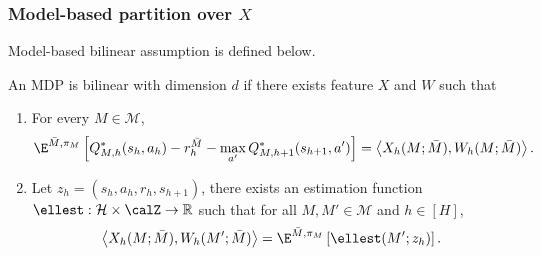 \subsubsection{Model-based partition over $X$}
Model-based bilinear assumption is defined below.
\begin{definition}
An MDP is bilinear with dimension $d$ if there exists feature $X$ and $W$ such that
\begin{enumerate}
    \item For every $M \in \mathcal{M}$, 
    \begin{align*}
        \E^{\Bar{M}, \pi_M}\left[Q_{M,h}^*(s_h,a_h) - r_h^{\Bar{M}} - \max_{a'} Q_{M, h+1}^*(s_{h+1}, a')\right] = \left\langle X_h(M;\Bar{M}), W_h(M;\Bar{M}) \right\rangle.
    \end{align*}
          
    \item Let $z_h = (s_h, a_h, r_h, s_{h+1})$, there exists an estimation function $\ellest: \mathcal{H} \times \calZ \rightarrow \mathbb{R}$ such that for all $M, M' \in \mathcal{M}$ and $h \in [H]$, 
    \begin{align*}
        \left\langle X_h(M;\Bar{M}), W_h(M';\Bar{M}) \right\rangle = \E^{\Bar{M}, \pi_M}\left[\ellest(M';z_h)\right].
    \end{align*}
\end{enumerate}
\end{definition}

